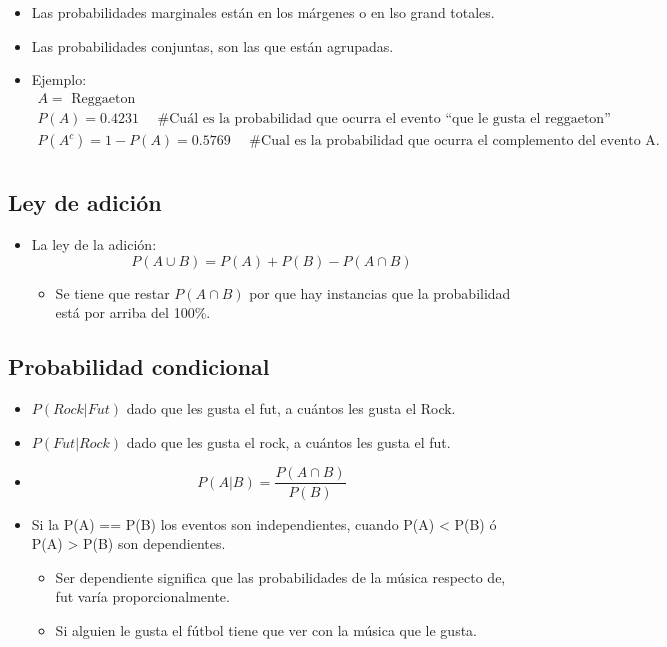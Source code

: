\section{}
\begin{itemize}
    \item Las probabilidades marginales están en los márgenes o en lso grand totales.
    \item Las probabilidades conjuntas, son las que están agrupadas.
    \item Ejemplo:
        \begin{align*}
            A= \text{  Reggaeton  } \\ 
            P(A)=0.4231 \quad \text{  \#Cuál es la probabilidad que ocurra el evento ``que le gusta el reggaeton''  } \\ 
            P(A^c)=1-P(A) = 0.5769 \quad \text{  \#Cual es la probabilidad que ocurra el complemento del evento A.  } \\ 
        \end{align*}
\end{itemize}

\subsection{Ley de adición}
\begin{itemize}
    \item La ley de la adición:
        \[
          P(A\cup B)= P(A)+P(B)-P(A\cap B)
        \]
        \begin{itemize}
            \item Se tiene que restar $P(A\cap B)$ por que hay instancias que la probabilidad está por arriba del 100\%.
        \end{itemize}
        
\end{itemize}

\subsection{Probabilidad condicional}
\begin{itemize}
    \item $P(Rock\vert Fut)$ dado que les gusta el fut, a cuántos les gusta el Rock.
    \item $P(Fut\vert Rock)$ dado que les gusta el rock, a cuántos les gusta el fut.
    \item \[
      P(A\vert B) = \frac{P(A\cap B)}{P(B)}
    \]
    
    \item Si la P(A) == P(B) los eventos son independientes, cuando P(A) < P(B) ó P(A) > P(B) son dependientes.
    \begin{itemize}
        \item Ser dependiente significa que las probabilidades de la música respecto de, fut varía proporcionalmente.
        \item Si alguien le gusta el fútbol tiene que ver con la música que le gusta. 
    \end{itemize}
\end{itemize}

